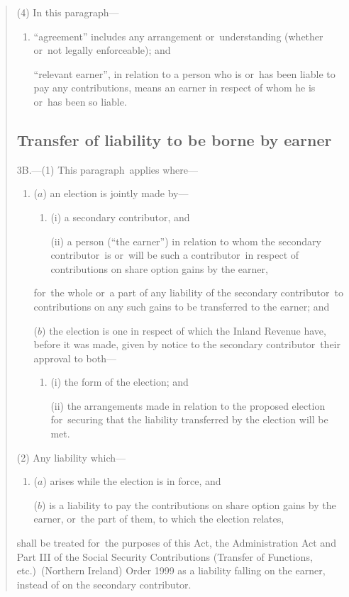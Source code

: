 \documentclass[12pt,a4paper]{article}
\begin{document}
\begin{quotation}
(4) In this paragraph—
\begin{enumerate}\item[]
    “agreement” includes any arrangement or~understanding (whether or~not legally enforceable); and

    “relevant earner”, in relation to a person who is or~has been liable to pay any contributions, means an earner in respect of whom he is or~has been so liable. 
\end{enumerate}

\subsection*{Transfer of liability to be borne by earner}

3B.---(1) This paragraph~applies where—
\begin{enumerate}\item[]
($a$) an election is jointly made by—
\begin{enumerate}\item[]
(i) a secondary contributor, and

(ii) a person (“the earner”) in relation to whom the secondary contributor~is or~will be such a contributor~in respect of contributions on share option gains by the earner,
\end{enumerate}
for~the whole or~a part of any liability of the secondary contributor~to contributions on any such gains to be transferred to the earner; and

($b$) the election is one in respect of which the Inland Revenue have, before it was made, given by notice to the secondary contributor~their approval to both—
\begin{enumerate}\item[]
(i) the form of the election; and

(ii) the arrangements made in relation to the proposed election for~securing that the liability transferred by the election will be met.
\end{enumerate}
\end{enumerate}

(2) Any liability which—
\begin{enumerate}\item[]
($a$) arises while the election is in force, and

($b$) is a liability to pay the contributions on share option gains by the earner, or~the part of them, to which the election relates,
\end{enumerate}
shall be treated for~the purposes of this Act, the Administration Act and Part III of the Social Security Contributions (Transfer of Functions, etc.)\ (Northern Ireland) Order 1999 as a liability falling on the earner, instead of on the secondary contributor.


\end{quotation}
\end{document}
